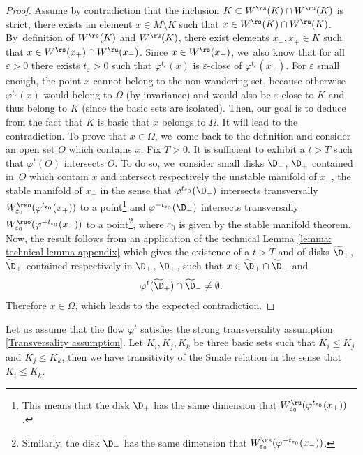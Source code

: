 \begin{appendix}
\begin{proof}
Assume by contradiction that the inclusion $K \subset W^\rs (K) \cap W^\ru (K)$ is strict, \ie there exists an element $x \in M \setminus K$ such that $x \in W^\rs (K) \cap W^\ru (K)$. By~definition of $W^\rs (K)$ and $W^\ru (K)$, there exist elements $x_-, x_+ \in K$ such that $x \in W^\rs (x_+) \cap W^\ru (x_-)$. Since $x \in W^\rs (x_{+})$, we~also know that for all $\varepsilon > 0$ there exists $t_{\varepsilon} > 0$ such that $\varphi^{t_{\varepsilon}} (x)$ is $\varepsilon$-close of $\varphi^{t_{\varepsilon}} (x_+)$. For $\varepsilon$ small enough, the point $x$ cannot belong to the non-wandering set, because otherwise $\varphi^{t_{\varepsilon}} (x)$ would belong to $\Omega$ (by invariance) and would also be $\varepsilon$-close to $K$ and thus belong to $K$ (since the basic sets are isolated). Then, our goal is to deduce from the fact that $K$ is basic that $x$ belongs to $\Omega$. It will lead to the contradiction. To prove that $x \in \Omega$, we~come back to the definition and consider an open set $O$ which contains $x$. Fix $T > 0$. It is sufficient to exhibit a $t > T$ such that $\varphi^t (O)$ intersects $O$. To do so, we~consider small disks $\D_{-}$, $\D_{+}$ contained in~$O$ which contain $x$ and intersect respectively the unstable manifold of $x_-$, the stable manifold of $x_+$ in the sense that $\varphi^{t_{\varepsilon_0}} (\D_+)$ intersects transversally $W_{\varepsilon_0}^{\rso} (\varphi^{t_{\varepsilon_0}} (x_+))$ to a point\footnote{This means that the disk $\D_+$ has the same dimension that $W_{\varepsilon_0}^\ru (\varphi^{t_{\varepsilon_0}} (x_+))$.} and $\varphi^{-t_{\varepsilon_0}} (\D_-)$ intersects transversally $W_{\varepsilon_0}^{\ruo} (\varphi^{-t_{\varepsilon_0}} (x_-))$ to a point\footnote{Similarly, the disk $\D_-$ has the same dimension that $W_{\varepsilon_0}^{\rs} (\varphi^{-t_{\varepsilon_0}} (x_-))$.}, where $\varepsilon_0$ is given by the stable manifold theorem. Now, the result follows from an application of the technical Lemma \ref{lemma: technical lemma appendix} which gives the existence of a $t > T$ and of disks $\widetilde{\D}_{+}$, $\widetilde{\D}_{+}$ contained respectively in $\D_{+}$, $\D_{+}$, such that $x \in \widetilde{\D}_+ \cap \widetilde{\D}_-$ and
\[
\varphi^t (\widetilde{\D}_{+}) \cap \widetilde{\D}_{-} \neq \emptyset.
\]
Therefore $x \in \Omega$, which leads to the expected contradiction.
\end{proof}

\begin{corollary}\label{cor: transitivity of Smale relation}
Let us assume that the flow $\varphi^t$ satisfies the strong transversality assumption \eqref{Transversality assumption}. Let $K_i, K_j, K_k$ be three basic sets such that $K_i \leq K_j$ and $K_j \leq K_k$, then we have transitivity of the Smale relation in the sense that $K_i \leq K_k$.
\end{corollary}


\end{appendix}
